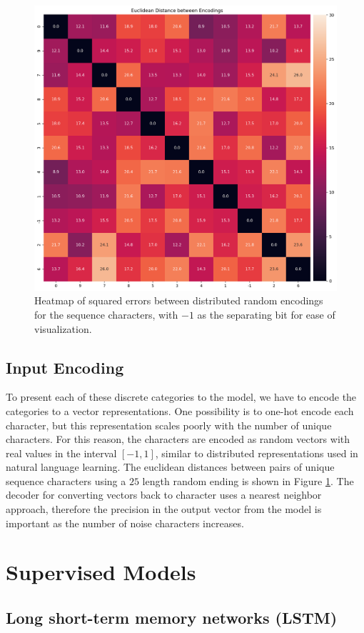 \documentclass{article}
\begin{document}
\begin{figure}[H]
    \centering
    \includegraphics[width=0.7\linewidth]{../notebooks/matrix-distances.png}
    \caption{Heatmap of squared errors between distributed random encodings for the sequence characters, with $-1$ as the separating bit for ease of visualization.}
    \label{fig:encoding-distance}
\end{figure}

\subsection*{Input Encoding}

To present each of these discrete categories to the model, we have to encode the categories to a vector representations. One possibility is to one-hot encode each character, but this representation scales poorly with the number of unique characters. For this reason, the characters are encoded as random vectors with real values in the interval $\left[-1, 1\right]$, similar to distributed representations used in natural language learning. \cite{mikolov2013distributed} The euclidean distances between pairs of unique sequence characters using a $25$ length random ending is shown in Figure \ref{fig:encoding-distance}. The decoder for converting vectors back to character uses a nearest neighbor approach, therefore the precision in the output vector from the model is important as the number of noise characters increases. 

\section*{Supervised Models}

\subsection*{Long short-term memory networks (LSTM)}
\end{document}
